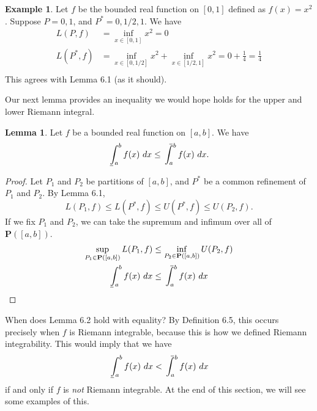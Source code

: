 \documentclass{article}
\def\upint{\mathchoice%
	{\mkern13mu\overline{\vphantom{\intop}\mkern7mu}\mkern-20mu}%
	{\mkern7mu\overline{\vphantom{\intop}\mkern7mu}\mkern-14mu}%
	{\mkern7mu\overline{\vphantom{\intop}\mkern7mu}\mkern-14mu}%
	{\mkern7mu\overline{\vphantom{\intop}\mkern7mu}\mkern-14mu}%
	\int}
\def\lowint{\mkern3mu\underline{\vphantom{\intop}\mkern7mu}\mkern-10mu\int}
\theoremstyle{definition}
\newtheorem{lemma}{Lemma}[section]
\newtheorem{example}{Example}[section]
\begin{document}
\begin{example}
	Let $ f $ be the bounded real function on $ [0,1] $ defined as $ f(x)=x^2 $. Suppose $ P={0,1} $, and $ P^*={0,1/2,1} $. We have \begin{align*}
		L(P,f)&=\inf\limits_{x\in[0,1]}x^2=0\\
		L(P^*,f)&=\inf\limits_{x\in[0,1/2]}x^2+\inf\limits_{x\in[1/2,1]}x^2=0+\frac{1}{4}=\frac{1}{4}\\
	\end{align*}
	This agrees with Lemma 6.1 (as it should).
\end{example}
Our next lemma provides an inequality we would hope holds for the upper and lower Riemann integral.
\begin{lemma}
	Let $ f $ be a bounded real function on $ [a,b] $. We have 
	$$\lowint_{a}^bf(x)\ dx\le \upint_{a}^bf(x)\ dx.$$
\end{lemma}
\begin{proof}
	Let $ P_1 $ and $ P_2 $ be partitions of $ [a,b] $, and $ P^* $ be a common refinement of $ P_1 $ and $ P_2 $. By Lemma 6.1,
	$$ L(P_1,f)\le L(P^*,f)\le U(P^*,f)\le U(P_2,f).$$ If we fix $ P_1 $ and $ P_2 $, we can take the supremum and infimum over all of $ \mathbf{P}([a,b]) $. 
	\begin{align*}
	\sup\limits_{P_1\in\textbf{P}([a,b])}	L(P_1,f)&\le \inf\limits_{P_2\in\textbf{P}([a,b])}U(P_2,f)\\\lowint_{a}^bf(x)\ dx&\le \upint_{a}^bf(x)\ dx
	\end{align*}
\end{proof}
When does Lemma 6.2 hold with equality? By Definition 6.5, this occurs precisely when $ f $ is Riemann integrable, because this is how we defined Riemann integrability. This would imply that we have $$\lowint_{a}^bf(x)\ dx< \upint_{a}^bf(x)\ dx $$ if and only if $ f $ is \textit{not} Riemann integrable. At the end of this section, we will see some examples of this.
\end{document}
